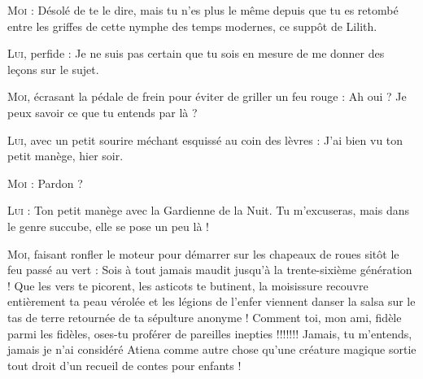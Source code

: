 \begin{dialogue}
\textsc{Moi} : Désolé de te le dire, mais tu n’es plus le même depuis que tu es retombé entre les griffes de cette nymphe des temps modernes, ce suppôt de Lilith.

%

\textsc{Lui}, perfide : Je ne suis pas certain que tu sois en mesure de me donner des leçons sur le sujet.

\textsc{Moi}, écrasant la pédale de frein pour éviter de griller un feu rouge : Ah oui ? Je peux savoir ce que tu entends par là ?

\textsc{Lui}, avec un petit sourire méchant esquissé au coin des lèvres : J’ai bien vu ton petit manège, hier soir.

\textsc{Moi} : Pardon ?

\textsc{Lui} : Ton petit manège avec la Gardienne de la Nuit. Tu m’excuseras, mais dans le genre succube, elle se pose un peu là !

\textsc{Moi}, faisant ronfler le moteur pour démarrer sur les chapeaux de roues sitôt le feu passé au vert : Sois à tout jamais maudit jusqu’à la trente-sixième génération ! Que les vers te picorent, les asticots te butinent, la moisissure recouvre entièrement ta peau vérolée et les légions de l’enfer viennent danser la salsa sur le tas de terre retournée de ta sépulture anonyme ! Comment toi, mon ami, fidèle parmi les fidèles, oses-tu proférer de pareilles inepties !!!!!!! Jamais, tu m’entends, jamais je n’ai considéré Atiena comme autre chose qu’une créature magique sortie tout droit d’un recueil de contes pour enfants !


\end{dialogue}
